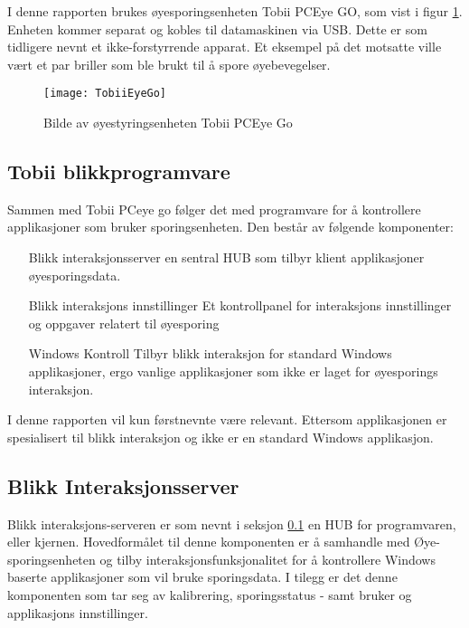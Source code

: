 I denne rapporten brukes øyesporingsenheten Tobii PCEye GO, som vist i figur \ref{fig:tobiiPc}. Enheten kommer separat og kobles til datamaskinen via USB. Dette er som tidligere nevnt et ikke-forstyrrende apparat. Et eksempel på det motsatte ville vært et par briller som ble brukt til å spore øyebevegelser. 



\begin{figure}[ht!]
\centering
\texttt{[image: TobiiEyeGo]}
\caption{Bilde av øyestyringsenheten Tobii PCEye Go}
\label{fig:tobiiPc}
\end{figure}


\subsection{Tobii blikkprogramvare}
\label{subsec:blikk}

Sammen med Tobii PCeye go følger det med programvare for å kontrollere applikasjoner som bruker sporingsenheten. Den består av følgende komponenter: 

\begin{itemize}
\item [Blikk interaksjonsserver] en sentral HUB som tilbyr klient applikasjoner øyesporingsdata. 
\item [Blikk interaksjons innstillinger] Et kontrollpanel for interaksjons innstillinger og oppgaver relatert til øyesporing
\item [Windows Kontroll] Tilbyr blikk interaksjon for standard Windows applikasjoner, ergo vanlige applikasjoner som ikke er laget for øyesporings interaksjon.
\end{itemize}

I denne rapporten vil kun førstnevnte være relevant. Ettersom applikasjonen er spesialisert til blikk interaksjon og ikke er en standard Windows applikasjon.

\subsection{Blikk Interaksjonsserver}

Blikk interaksjons-serveren er som nevnt i seksjon \ref{subsec:blikk} en HUB for programvaren, eller kjernen. Hovedformålet til denne komponenten er å samhandle med Øye-sporingsenheten og tilby interaksjonsfunksjonalitet for å kontrollere Windows baserte applikasjoner som vil bruke sporingsdata. I tilegg er det denne komponenten som tar seg av kalibrering, sporingsstatus - samt bruker og applikasjons innstillinger.

